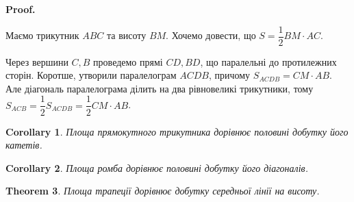\documentclass[a4paper, 10pt]{article}
\makeatletter
\theoremstyle{theoremdd}
\newtheorem{theorem}{Theorem}[subsection]
\theoremstyle{theoremdd}
\theoremstyle{theoremdd}
\theoremstyle{theoremdd}
\theoremstyle{theoremdd}
\theoremstyle{theoremdd}
\theoremstyle{theoremdd}
\theoremstyle{theoremdd}
\theoremstyle{theoremdd}
\newtheorem{corollary}[theorem]{Corollary}
\renewenvironment{proof}[1][Proof.\\]{\par
\pushQED{\hfill \qed}%
\normalfont \topsep6\p@\@plus6\p@\relax
\trivlist
\item\relax
{\bfseries
#1\@addpunct{.}}\hspace\labelsep\ignorespaces
}{%
\popQED\endtrivlist\@endpefalse
}
\makeatother
\begin{document}
\begin{proof}
Маємо трикутник $ABC$ та висоту $BM$. Хочемо довести, що $S = \dfrac{1}{2} BM \cdot AC$.
\begin{figure}[H]
\centering
{}
\end{figure}
Через вершини $C,B$ проведемо прямі $CD,BD$, що паралельні до протилежних сторін. Коротше, утворили паралелограм $ACDB$, причому $S_{ACDB} = CM \cdot AB$. Але діагональ паралелограма ділить на два рівновеликі трикутники, тому $S_{ACB} = \dfrac{1}{2} S_{ACDB} = \dfrac{1}{2} CM \cdot AB$.
\end{proof}

\begin{corollary}
Площа прямокутного трикутника дорівнює половині добутку його катетів.
\end{corollary}

\begin{corollary}
Площа ромба дорівнює половині добутку його діагоналів.
\end{corollary}

\begin{theorem}
Площа трапеції дорівнює добутку середньої лінії на висоту.
\end{theorem}
\end{document}
